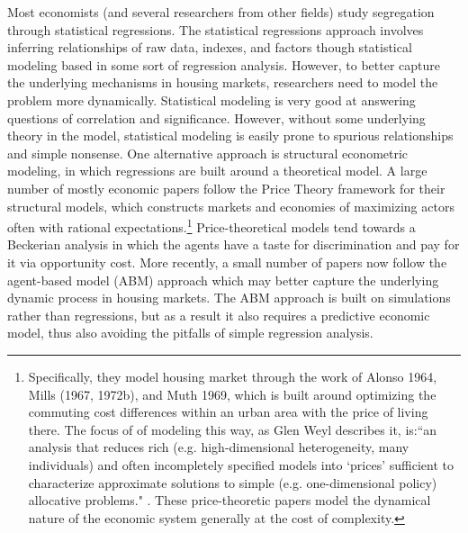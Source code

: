 \documentclass[11pt]{asaproc}
\newcommand{\1}{\mathbb{1}}
\begin{document}
Most economists (and several researchers from other fields) study segregation through statistical regressions. The statistical regressions approach involves inferring relationships of raw data, indexes, and factors though statistical modeling based in some sort of regression analysis. However, to better capture the underlying mechanisms in housing markets, researchers need to model the problem more dynamically. Statistical modeling is very good at answering questions of correlation and significance. However, without some underlying theory in the model, statistical modeling is easily prone to spurious relationships and simple nonsense.  One alternative approach is structural econometric modeling, in which regressions are built around a theoretical model. A large number of mostly economic papers follow the Price Theory framework for their structural models, which constructs markets and economies of maximizing actors often with rational expectations.\footnote{Specifically, they model housing market through the work of Alonso 1964\citep{alonso64}, Mills (1967, 1972b)\citep{mills67,mills72a,mills72b}, and Muth 1969\citep{muth69}, which is built around optimizing the commuting cost differences within an urban area with the price of living there. The focus of of modeling this way, as Glen Weyl describes it, is:``an analysis that reduces rich (e.g. high-dimensional heterogeneity, many individuals) and often incompletely specified models into `prices’ sufficient to characterize approximate solutions to simple (e.g. one-dimensional policy) allocative problems." \citep{weyl15}. These price-theoretic papers model the dynamical nature of the economic system generally at the cost of complexity.} Price-theoretical models tend towards a Beckerian analysis in which the agents have a taste for discrimination and pay for it via opportunity cost. More recently, a small number of papers now follow the agent-based model (ABM) approach which may better capture the underlying dynamic process in housing markets. The ABM approach is built on simulations rather than regressions, but as a result it also requires a predictive economic model, thus also avoiding the pitfalls of simple regression analysis.  
\end{document}
